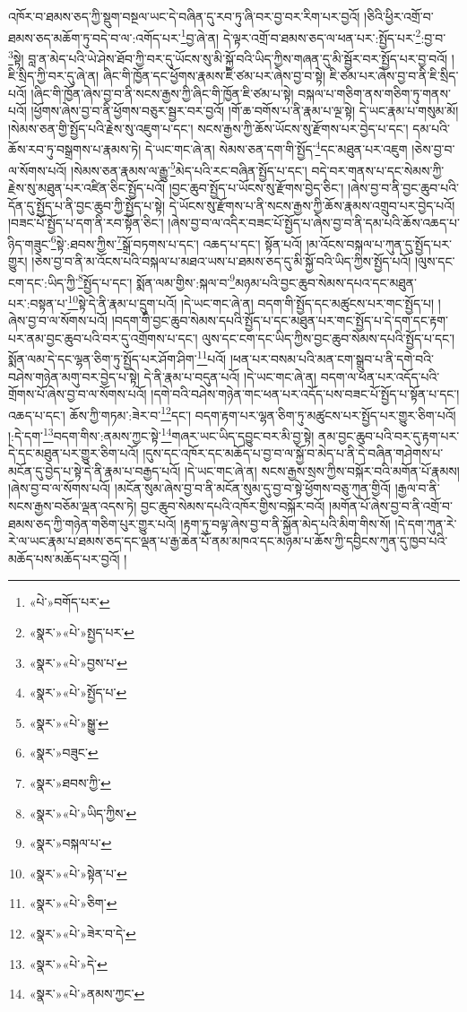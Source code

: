འཁོར་བ་ཐམས་ཅད་ཀྱི་སྡུག་བསྔལ་ཡང་དེ་བཞིན་དུ་རབ་ཏུ་ཞི་བར་བྱ་བར་རིག་པར་བྱའོ། །ཅིའི་ཕྱིར་འགྲོ་བ་ཐམས་ཅད་མཆོག་ཏུ་བདེ་བ་ལ་:འགོད་པར་\footnote{«པེ་»བགོད་པར་}བྱ་ཞེ་ན། དེ་ལྟར་འགྲོ་བ་ཐམས་ཅད་ལ་ཕན་པར་:སྤྱོད་པར་\footnote{«སྣར་»«པེ་»སྤྱད་པར་}:བྱ་བ་\footnote{«སྣར་»«པེ་»བྱས་པ་}སྟེ། བླ་ན་མེད་པའི་ཡེ་ཤེས་ཐོབ་ཀྱི་བར་དུ་ཡོངས་སུ་མི་སྐྱོ་བའི་ཡིད་ཀྱིས་གཞན་དུ་མི་སྦྱོར་བར་སྤྱོད་པར་བྱ་བའོ། །ཇི་སྲིད་ཀྱི་བར་དུ་ཞེ་ན། ཞིང་གི་ཁྱོན་དང་ཕྱོགས་རྣམས་ཇི་ཙམ་པར་ཞེས་བྱ་བ་སྟེ། ཇི་ཙམ་པར་ཞེས་བྱ་བ་ནི་ཇི་སྲིད་པའོ། །ཞིང་གི་ཁྱོན་ཞེས་བྱ་བ་ནི་སངས་རྒྱས་ཀྱི་ཞིང་གི་ཁྱོན་ཇི་ཙམ་པ་སྟེ། བསྐལ་པ་གཅིག་ནས་གཅིག་ཏུ་གནས་པའོ། །ཕྱོགས་ཞེས་བྱ་བ་ནི་ཕྱོགས་བཅུར་སྦྱར་བར་བྱའོ། །གོ་ཆ་བགོས་པ་ནི་རྣམ་པ་ལྔ་སྟེ། དེ་ཡང་རྣམ་པ་གསུམ་མོ། །སེམས་ཅན་གྱི་སྤྱོད་པའི་རྗེས་སུ་འཇུག་པ་དང་། སངས་རྒྱས་ཀྱི་ཆོས་ཡོངས་སུ་རྫོགས་པར་བྱེད་པ་དང་། དམ་པའི་ཆོས་རབ་ཏུ་བསྒྲགས་པ་རྣམས་ཏེ། དེ་ཡང་གང་ཞེ་ན། སེམས་ཅན་དག་གི་སྤྱོད་\footnote{«སྣར་»«པེ་»སྤྱོད་པ་}དང་མཐུན་པར་འཇུག །ཅེས་བྱ་བ་ལ་སོགས་པའོ། །སེམས་ཅན་རྣམས་ལ་རྒྱུ་\footnote{«སྣར་»«པེ་»སྒྱུ་}མེད་པའི་རང་བཞིན་སྤྱོད་པ་དང་། བདེ་བར་གནས་པ་དང་སེམས་ཀྱི་རྗེས་སུ་མཐུན་པར་འཛིན་ཅིང་སྤྱོད་པའོ། །བྱང་ཆུབ་སྤྱོད་པ་ཡོངས་སུ་རྫོགས་བྱེད་ཅིང་། །ཞེས་བྱ་བ་ནི་བྱང་ཆུབ་པའི་དོན་དུ་སྤྱོད་པ་ནི་བྱང་ཆུབ་ཀྱི་སྤྱོད་པ་སྟེ། དེ་ཡོངས་སུ་རྫོགས་པ་ནི་སངས་རྒྱས་ཀྱི་ཆོས་རྣམས་འགྲུབ་པར་བྱེད་པའོ། །བཟང་པོ་སྤྱོད་པ་དག་ནི་རབ་སྟོན་ཅིང་། །ཞེས་བྱ་བ་ལ་འདིར་བཟང་པོ་སྤྱོད་པ་ཞེས་བྱ་བ་ནི་དམ་པའི་ཆོས་འཆད་པ་ཉིད་གཟུང་\footnote{«སྣར་»བཟུང་}སྟེ་:ཐབས་ཀྱིས་\footnote{«སྣར་»ཐབས་ཀྱི་}སྒྲོ་བཏགས་པ་དང་། འཆད་པ་དང་། སྟོན་པའོ། །མ་འོངས་བསྐལ་པ་ཀུན་དུ་སྤྱོད་པར་གྱུར། །ཅེས་བྱ་བ་ནི་མ་འོངས་པའི་བསྐལ་པ་མཐའ་ཡས་པ་ཐམས་ཅད་དུ་མི་སྐྱོ་བའི་ཡིད་ཀྱིས་སྤྱོད་པའོ། །ལུས་དང་ངག་དང་:ཡིད་ཀྱི་\footnote{«སྣར་»«པེ་»ཡིད་ཀྱིས་}སྤྱོད་པ་དང་། སྨོན་ལམ་གྱིས་:སྐལ་བ་\footnote{«སྣར་»བསྐལ་པ་}མཉམ་པའི་བྱང་ཆུབ་སེམས་དཔའ་དང་མཐུན་པར་:བསྟན་པ་\footnote{«སྣར་»«པེ་»སྟེན་པ་}སྟེ་དེ་ནི་རྣམ་པ་དྲུག་པའོ། །དེ་ཡང་གང་ཞེ་ན། བདག་གི་སྤྱོད་དང་མཚུངས་པར་གང་སྤྱོད་པ། །ཞེས་བྱ་བ་ལ་སོགས་པའོ། །བདག་གི་བྱང་ཆུབ་སེམས་དཔའི་སྤྱོད་པ་དང་མཐུན་པར་གང་སྤྱོད་པ་དེ་དག་དང་རྟག་པར་ནམ་བྱང་ཆུབ་པའི་བར་དུ་འགྲོགས་པ་དང་། ལུས་དང་ངག་དང་ཡིད་ཀྱིས་བྱང་ཆུབ་སེམས་དཔའི་སྤྱོད་པ་དང་། སྨོན་ལམ་དེ་དང་ལྷན་ཅིག་ཏུ་སྤྱོད་པར་ཤོག་ཤིག་\footnote{«སྣར་»«པེ་»ཅིག་}པའོ། །ཕན་པར་བསམ་པའི་མན་ངག་སྒྲུབ་པ་ནི་དགེ་བའི་བཤེས་གཉེན་མགུ་བར་བྱེད་པ་སྟེ། དེ་ནི་རྣམ་པ་བདུན་པའོ། །དེ་ཡང་གང་ཞེ་ན། བདག་ལ་ཕན་པར་འདོད་པའི་གྲོགས་པོ་ཞེས་བྱ་བ་ལ་སོགས་པའོ། །དགེ་བའི་བཤེས་གཉེན་གང་ཕན་པར་འདོད་པས་བཟང་པོ་སྤྱོད་པ་སྟོན་པ་དང་། འཆད་པ་དང་། ཆོས་ཀྱི་གཏམ་:ཟེར་བ་\footnote{«སྣར་»«པེ་»ཟེར་བ་དེ་}དང་། བདག་རྟག་པར་ལྷན་ཅིག་ཏུ་མཚུངས་པར་སྤྱོད་པར་གྱུར་ཅིག་པའོ། །:དེ་དག་\footnote{«སྣར་»«པེ་»དེ་}བདག་གིས་:ནམས་ཀྱང་སྟེ་\footnote{«སྣར་»«པེ་»ནམས་ཀྱང་}གཞར་ཡང་ཡིད་དབྱུང་བར་མི་བྱ་སྟེ། ནམ་བྱང་ཆུབ་པའི་བར་དུ་རྟག་པར་དེ་དང་མཐུན་པར་གྱུར་ཅིག་པའོ། །དུས་དང་འཁོར་དང་མཆོད་པ་བྱ་བ་ལ་སྐྱོ་བ་མེད་པ་ནི་དེ་བཞིན་གཤེགས་པ་མངོན་དུ་བྱེད་པ་སྟེ་དེ་ནི་རྣམ་པ་བརྒྱད་པའོ། །དེ་ཡང་གང་ཞེ་ན། སངས་རྒྱས་སྲས་ཀྱིས་བསྐོར་བའི་མགོན་པོ་རྣམས། །ཞེས་བྱ་བ་ལ་སོགས་པའོ། །མངོན་སུམ་ཞེས་བྱ་བ་ནི་མངོན་སུམ་དུ་བྱ་བ་སྟེ་ཕྱོགས་བཅུ་ཀུན་གྱིའོ། །རྒྱལ་བ་ནི་སངས་རྒྱས་བཅོམ་ལྡན་འདས་ཏེ། བྱང་ཆུབ་སེམས་དཔའི་འཁོར་གྱིས་བསྐོར་བའོ། །མགོན་པོ་ཞེས་བྱ་བ་ནི་འགྲོ་བ་ཐམས་ཅད་ཀྱི་གཉེན་གཅིག་པུར་གྱུར་པའོ། །རྟག་ཏུ་བལྟ་ཞེས་བྱ་བ་ནི་སྐྱོན་མེད་པའི་མིག་གིས་སོ། །དེ་དག་ཀུན་རེ་རེ་ལ་ཡང་རྣམ་པ་ཐམས་ཅད་དང་ལྡན་པ་རྒྱ་ཆེན་པོ་ནམ་མཁའ་དང་མཉམ་པ་ཆོས་ཀྱི་དབྱིངས་ཀུན་དུ་ཁྱབ་པའི་མཆོད་པས་མཆོད་པར་བྱའོ། །
